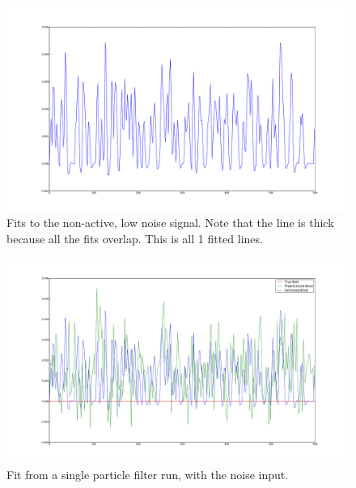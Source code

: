 \begin{figure}[H]
\label{fig:fits_noiseonly}
\includegraphics[trim=6cm 3cm 6cm 3cm,width=16cm]{images/fits_noiseonly}
\caption{Fits to the non-active, low noise signal. Note that the line is thick because all
the fits overlap. This is all 1 fitted lines.}
\end{figure}

\begin{figure}[H]
\label{fig:justnoise_fit_0}
\includegraphics[trim=6cm 3cm 6cm 3cm,width=16cm]{images/justnoise_fit_0}
\caption{Fit from a single particle filter run, with the noise input. }
\end{figure} %

